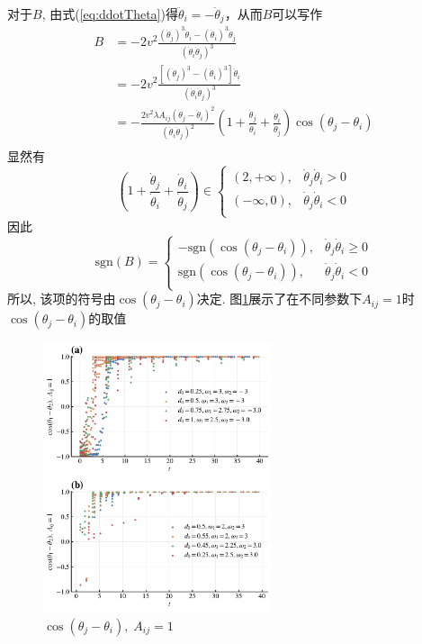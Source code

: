 \documentclass{article}
\begin{document}
对于$B$, 由式(\ref{eq:ddotTheta})得$\ddot{\theta}_i=-\ddot{\theta}_j$，从而$B$可以写作
$$
\begin{aligned}
	B&=-2v^2\frac{\left( \dot{\theta}_j \right) ^3\ddot{\theta}_i-\left( \dot{\theta}_i \right) ^3\ddot{\theta}_j}{\left( \dot{\theta}_i\dot{\theta}_j \right) ^3}\\
	&=-2v^2\frac{\left[ \left( \dot{\theta}_j \right) ^3-\left( \dot{\theta}_i \right) ^3 \right] \ddot{\theta}_i}{\left( \dot{\theta}_i\dot{\theta}_j \right) ^3}\\
	&=-\frac{2v^2\lambda A_{ij}\left( \dot{\theta}_j-\dot{\theta}_i \right) ^2}{\left( \dot{\theta}_i\dot{\theta}_j \right) ^2}\left( 1+\frac{\dot{\theta}_j}{\dot{\theta}_i}+\frac{\dot{\theta}_i}{\dot{\theta}_j} \right) \cos \left( \theta _j-\theta _i \right)\\
\end{aligned}
$$
显然有
$$
\left( 1+\frac{\dot{\theta}_j}{\dot{\theta}_i}+\frac{\dot{\theta}_i}{\dot{\theta}_j} \right) \in \begin{cases}
	\left( 2,+\infty \right) ,&		\dot{\theta}_j\dot{\theta}_i>0\\
	\left( -\infty , 0 \right) ,&		\dot{\theta}_j\dot{\theta}_i<0\\
\end{cases}
$$
因此
$$
\text{sgn} \left( B \right) =\begin{cases}
	-\text{sgn} \left( \cos \left( \theta _j-\theta _i \right) \right) ,&		\dot{\theta}_j\dot{\theta}_i\geqslant 0\\
	\text{sgn} \left( \cos \left( \theta _j-\theta _i \right) \right), &		\dot{\theta}_j\dot{\theta}_i<0\\
\end{cases}
$$
所以, 该项的符号由$\cos \left( \theta _j-\theta _i \right)$决定. 图\ref{fig:2OsCosDeltaTheta}展示了在不同参数下$A_{ij}=1$时$\cos \left( \theta _j-\theta _i \right)$的取值

\begin{figure}[H]
    \centering
    \includegraphics[width=0.6\textwidth]{./figs/2OsCosDeltaTheta.pdf}
    \caption{$\cos \left( \theta _j-\theta _i \right),\;A_{ij}=1$}
    \label{fig:2OsCosDeltaTheta}
\end{figure}
\end{document}
